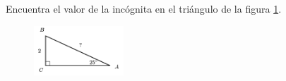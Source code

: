 Encuentra el valor de la incógnita en el triángulo de la figura \ref{fig:lados_functrig_10}.
\begin{figure}[H]
    \begin{center}
        \includegraphics[width=0.3\textwidth]{../images/lados_functrig_10.png}
    \end{center}
    \caption{}
    \label{fig:lados_functrig_10}
\end{figure}